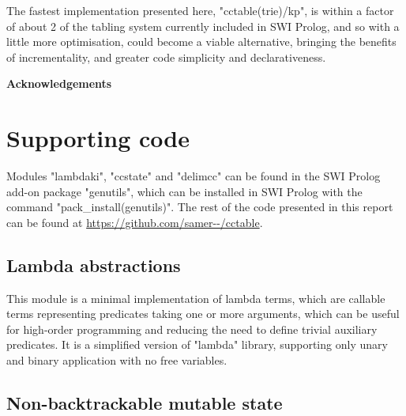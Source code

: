 The fastest implementation presented here, "cctable(trie)/kp", is within a factor of about 
2 of the tabling system currently included in SWI Prolog, and so with a little more 
optimisation, could become a viable alternative, bringing the benefits of incrementality,
and greater code simplicity and declarativeness.

\bigskip
\noindent
\textbf{Acknowledgements}\\[0.5em]
\TheAcknowledgments

\appendix
\section{Supporting code}

Modules "lambdaki", "ccstate" and "delimcc" can be found in the SWI Prolog
add-on package "genutils", which can be installed in SWI Prolog with the command
"pack_install(genutils)". The rest of the code presented in this report can be
found at \url{https://github.com/samer--/cctable}.

\subsection{Lambda abstractions}
\label{sec:lambdaki}

This module is a minimal implementation of lambda terms, which are callable terms representing
predicates taking one or more arguments, which can be useful for high-order programming and
reducing the need to define trivial auxiliary predicates. It is a simplified version of 
 "lambda" library,
supporting only unary and binary application with no free variables.


\subsection{Non-backtrackable mutable state}
\label{app:ccnbstate}

